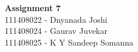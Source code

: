 \documentclass[main.tex]{subfiles}
\begin{document}
\begin{titlepage}

\begin{center}
  \LARGE{\bf{Assignment 7\\}}
  \horrule{0.4pt}
  111408022 - Dnyanada Joshi \\
  111408024 - Gaurav Juvekar \\
  111408025 - K Y Sandeep Somanna \\
\end{center}
\horrule{0.4pt}
\end{titlepage}
\end{document}
